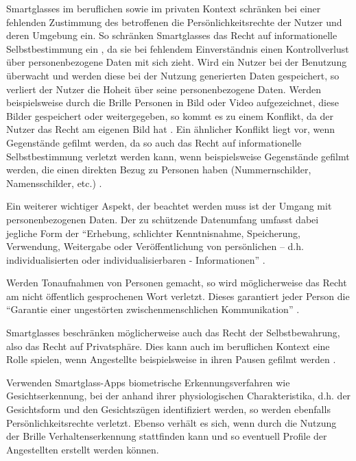 Smartglasses im beruflichen  sowie im privaten Kontext schränken bei einer fehlenden Zustimmung des betroffenen die Persönlichkeitsrechte der Nutzer und deren Umgebung ein. So schränken Smartglasses das Recht auf informationelle Selbstbestimmung ein \cite[S.~100]{Schwenke2016}, da sie bei fehlendem Einverständnis einen Kontrollverlust über personenbezogene Daten mit sich zieht. Wird ein Nutzer bei der Benutzung überwacht und werden diese bei der Nutzung generierten Daten gespeichert, so verliert der Nutzer die Hoheit über seine personenbezogene Daten. Werden beispielsweise durch die Brille Personen in Bild oder Video aufgezeichnet, diese Bilder gespeichert oder weitergegeben, so kommt es zu einem Konflikt, da der Nutzer das Recht am eigenen Bild hat \cite[S.~104ff]{Schwenke2016} \cite[S.~109f]{Schwenke2016}. 
Ein ähnlicher Konflikt liegt vor, wenn Gegenstände gefilmt werden, da so auch das Recht auf informationelle Selbstbestimmung verletzt werden kann, wenn beispielsweise Gegenstände gefilmt werden, die einen direkten Bezug zu Personen haben (Nummernschilder, Namensschilder, etc.) \cite[S.~106]{Schwenke2016}. 

Ein weiterer wichtiger Aspekt, der beachtet werden muss ist der Umgang mit personenbezogenen Daten. Der zu schützende Datenumfang umfasst dabei jegliche Form der
\enquote{Erhebung, schlichter Kenntnisnahme, Speicherung, Verwendung, Weitergabe oder Veröffentlichung von persönlichen – d.h. individualisierten oder individualisierbaren - Informationen} \cite[S.~108]{Schwenke2016}.

Werden Tonaufnahmen von Personen gemacht, so wird möglicherweise das Recht am nicht öffentlich gesprochenen Wort verletzt. Dieses garantiert jeder Person die \enquote{Garantie einer ungestörten zwischenmenschlichen Kommunikation} \cite[S.~112]{Schwenke2016}.

Smartglasses beschränken möglicherweise auch das Recht der Selbstbewahrung, also das Recht auf Privatsphäre. Dies kann auch im beruflichen Kontext eine Rolle spielen, wenn Angestellte beispielsweise in ihren Pausen gefilmt werden \cite[S.~114f]{Schwenke2016}.

Verwenden Smartglass-Apps biometrische Erkennungsverfahren wie Gesichtserkennung, bei der anhand ihrer physiologischen Charakteristika, d.h. der Gesichtsform und den Gesichtszügen identifiziert werden, so werden ebenfalls Persönlichkeitsrechte verletzt. Ebenso verhält es sich, wenn durch die Nutzung der Brille Verhaltenserkennung stattfinden kann und so eventuell Profile der Angestellten erstellt werden können.

